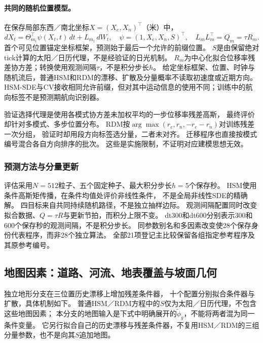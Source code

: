 \paragraph{共同的随机位置模型。}
在保存局部东西／南北坐标$X=(X_e,X_n)^\top$（米）中，
\begin{equation}\label{eq:ordinary-full}
 dX_t=\Theta_{m_t}^{\top}\psi(X_t,t)\,dt+L_{m_t}\,dW_t,
 \quad\psi=(1,X_e,X_n,S)^\top,\quad L_mL_m^\top=Q_m=\tau R_m.
\end{equation}
首个可见位置锚定坐标框架，预测始于最后一个允许的前缀位置。
$S$是由保留绝对tick计算的太阳／日历代理\cite{noaa}，不是经验证的日光机制。
$R_m$为中心化拟合位移率残差协方差；转换使用观测间隔$\tau$，不是积分步长$h$。
给定坐标框架、位置、时钟与随机流后，普通HSM和RDM的漂移、扩散及分量概率不读取初速度或近期方向。
HSM-SDE与CV接收相同允许前缀，但对其中运动信息的使用不同；训练中的航向标签不是预测期航向识别器。


验证选择代理是使用各模式协方差未加权平均的一步位移率残差高斯，
最终评价却针对多模式、多步位置分布。
RDM按$\arg\max(r_e,r_n,-r_e-r_n)$对训练残差一次分组，
验证时却用段方向标签选分量，二者未对齐。
迁移程序也直接按模式编号混合各自方向排序的批次\cite{nichol2018}。
这些是实施限制，不证明对应建模思想无效。

\subsubsection{预测方法与分量更新}\label{sec:forecast-methods}
评估采用$N=512$粒子、五个固定种子、最大积分步长$h=5$个保存秒。
HSM使用条件高斯矩传播，在条件均值处评价非线性条件，
不是全局非线性SDE的精确解\cite{kloeden1992}。
四目标来自共同持续随机路径，不是独立抽样边际。
观测间隔配置同时改变拟合数据、$Q=\tau R$与更新节拍，而积分上限不变。
dt300和dt600分别表示300和600个保存秒的观测间隔，不是积分步长。
同参数别名和多因素改变使28个保存身份代表程序，而非28个独立算法。
全部21项登记主比较保留各组指定参考程序及其原参考编号。


\subsection{地图因素：道路、河流、地表覆盖与坡面几何}\label{sec:terrain-methods}
独立地形分支在三位置历史漂移上增加残差条件器，
十个配置分别拟合条件器与扩散，具体机制如下。
普通HSM／RDM方程中的$S$仅为太阳／日历代理，不包含这些地图因素；
本分支的地图输入是下式中明确展开的$\widetilde\phi_g$，不能将两者混为同一条件变量。
它另行拟合自己的历史漂移与残差条件器，不复用HSM／RDM的三组分量参数，也不是向其$S$追加地图。

